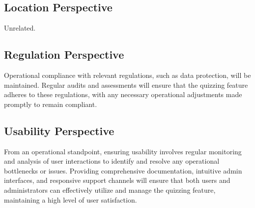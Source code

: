 \subsection{Location Perspective}

Unrelated.


\subsection{Regulation Perspective}

Operational compliance with relevant regulations, such as data protection, will be maintained. Regular audits and assessments will ensure that the quizzing feature adheres to these regulations, with any necessary operational adjustments made promptly to remain compliant.


\subsection{Usability Perspective}

From an operational standpoint, ensuring usability involves regular monitoring and analysis of user interactions to identify and resolve any operational bottlenecks or issues. Providing comprehensive documentation, intuitive admin interfaces, and responsive support channels will ensure that both users and administrators can effectively utilize and manage the quizzing feature, maintaining a high level of user satisfaction.
